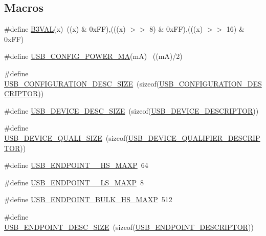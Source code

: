 \subsection*{Macros}
\begin{DoxyCompactItemize}
\item 
\#define \hyperlink{group__USBD__Core_ga217165f37f8e1835ea51da6e19768402}{B3\+V\+AL}(x)~((x) \& 0x\+F\+F),(((x) $>$$>$ 8) \& 0x\+F\+F),(((x) $>$$>$ 16) \& 0x\+F\+F)
\item 
\#define \hyperlink{group__USBD__Core_ga92087162f5b3634a1e7843be05702c37}{U\+S\+B\+\_\+\+C\+O\+N\+F\+I\+G\+\_\+\+P\+O\+W\+E\+R\+\_\+\+MA}(mA)                            ~((mA)/2)
\item 
\#define \hyperlink{group__USBD__Core_ga136546c0b0fefbc4d0684f1a70a86d3e}{U\+S\+B\+\_\+\+C\+O\+N\+F\+I\+G\+U\+R\+A\+T\+I\+O\+N\+\_\+\+D\+E\+S\+C\+\_\+\+S\+I\+ZE}~(sizeof(\hyperlink{group__USBD__Core_ga196f799666c475a9064909c6e72b9d72}{U\+S\+B\+\_\+\+C\+O\+N\+F\+I\+G\+U\+R\+A\+T\+I\+O\+N\+\_\+\+D\+E\+S\+C\+R\+I\+P\+T\+OR}))
\item 
\#define \hyperlink{group__USBD__Core_gacd04660262562260957b6df8d5e482b3}{U\+S\+B\+\_\+\+D\+E\+V\+I\+C\+E\+\_\+\+D\+E\+S\+C\+\_\+\+S\+I\+ZE}~(sizeof(\hyperlink{group__USBD__Core_ga7c2da119cc5c129d253d5fa766c70893}{U\+S\+B\+\_\+\+D\+E\+V\+I\+C\+E\+\_\+\+D\+E\+S\+C\+R\+I\+P\+T\+OR}))
\item 
\#define \hyperlink{group__USBD__Core_ga038630c136094c9f727b62cb81a9a186}{U\+S\+B\+\_\+\+D\+E\+V\+I\+C\+E\+\_\+\+Q\+U\+A\+L\+I\+\_\+\+S\+I\+ZE}~(sizeof(\hyperlink{group__USBD__Core_ga4460a327f0c59c1d44e550efcff1eb00}{U\+S\+B\+\_\+\+D\+E\+V\+I\+C\+E\+\_\+\+Q\+U\+A\+L\+I\+F\+I\+E\+R\+\_\+\+D\+E\+S\+C\+R\+I\+P\+T\+OR}))
\item 
\#define \hyperlink{group__USBD__Core_gac8df859211824ddcf32db5c80b06290a}{U\+S\+B\+\_\+\+E\+N\+D\+P\+O\+I\+N\+T\+\_\+\_\+\+H\+S\+\_\+\+M\+A\+XP}~64
\item 
\#define \hyperlink{group__USBD__Core_ga2b0c6c2be1d518967da6c7b32458c894}{U\+S\+B\+\_\+\+E\+N\+D\+P\+O\+I\+N\+T\+\_\+\_\+\+L\+S\+\_\+\+M\+A\+XP}~8
\item 
\#define \hyperlink{group__USBD__Core_gad4839d37e7a31a4d9e8ddf242b16608f}{U\+S\+B\+\_\+\+E\+N\+D\+P\+O\+I\+N\+T\+\_\+\+B\+U\+L\+K\+\_\+\+H\+S\+\_\+\+M\+A\+XP}~512
\item 
\#define \hyperlink{group__USBD__Core_ga317f2697db907bff3f818a644d231c08}{U\+S\+B\+\_\+\+E\+N\+D\+P\+O\+I\+N\+T\+\_\+\+D\+E\+S\+C\+\_\+\+S\+I\+ZE}~(sizeof(\hyperlink{group__USBD__Core_ga652b2871268bd903653cbff0f3448a6e}{U\+S\+B\+\_\+\+E\+N\+D\+P\+O\+I\+N\+T\+\_\+\+D\+E\+S\+C\+R\+I\+P\+T\+OR}))

\end{DoxyCompactItemize}
